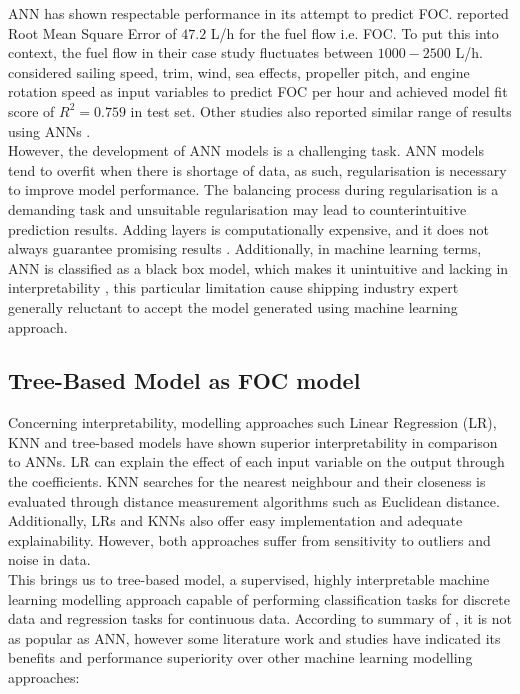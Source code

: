 ANN has shown respectable performance in its attempt to predict FOC.  reported Root Mean Square Error of $47.2$ L/h for the fuel flow i.e. FOC. To put this into context, the fuel flow in their case study fluctuates between $1000 - 2500$ L/h.  considered sailing speed, trim, wind, sea effects, propeller pitch, and engine rotation speed as input variables to predict FOC per hour and achieved model fit score of $R^2 = 0.759$ in test set. Other studies also reported similar range of results using ANNs .\\

However, the development of ANN models is a challenging task. ANN models tend to overfit when there is shortage of data, as such, regularisation is necessary to improve model performance. The balancing process during regularisation is a demanding task and unsuitable regularisation may lead to counterintuitive prediction results. Adding layers is computationally expensive, and it does not always guarantee promising results . Additionally, in machine learning terms, ANN is classified as a black box model, which makes it unintuitive and lacking in interpretability  , this particular limitation cause shipping industry expert generally reluctant to accept the model generated using machine learning approach. \\

\subsection{Tree-Based Model as FOC model}\label{sec:tree_litreview}

Concerning interpretability, modelling approaches such Linear Regression (LR), KNN and tree-based models have shown superior interpretability in comparison to ANNs. LR can explain the effect of each input variable on the output through the coefficients. KNN searches for the nearest neighbour and their closeness is evaluated through distance measurement algorithms such as Euclidean distance. Additionally, LRs and KNNs also offer easy implementation and adequate explainability. However, both approaches suffer from sensitivity to outliers and noise in data.\\

This brings us to tree-based model, a supervised, highly interpretable machine learning modelling approach capable of performing classification tasks for discrete data and regression tasks for continuous data. According to summary of , it is not as popular as ANN, however some literature work and studies have indicated its benefits and performance superiority over other machine learning modelling approaches:\\

